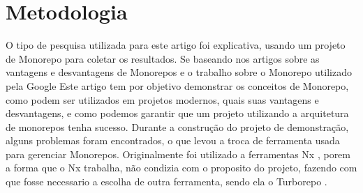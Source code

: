 \section{Metodologia}

O tipo de pesquisa utilizada para este artigo foi explicativa, usando um projeto de Monorepo para coletar os resultados. Se baseando nos artigos sobre as vantagens e desvantagens de Monorepos \cite{advantages-and-disvantages-of-monorepos} e o trabalho sobre o Monorepo utilizado pela Google \cite{google-monorepo}
Este artigo tem por objetivo demonstrar os conceitos de Monorepo, como podem ser utilizados em projetos modernos, quais suas vantagens e desvantagens, e como podemos garantir que um projeto utilizando a arquitetura de monorepos tenha sucesso.
Durante a construção do projeto de demonstração, alguns problemas foram encontrados, o que levou a troca de ferramenta usada para gerenciar Monorepos. Originalmente foi utilizado a ferramentas Nx \cite{introduction-to-nx}, porem a forma que o Nx trabalha, não condizia com o proposito do projeto, fazendo com que fosse necessario a escolha de outra ferramenta, sendo ela o Turborepo \cite{turborepo}.